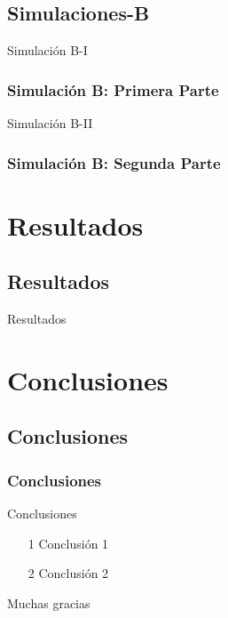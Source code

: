 \documentclass{beamer}
\begin{document}
\subsection{Simulaciones-B}
\begin{frame}{Simulación B-I}

\frametitle{Simulación B: Primera Parte}
\end{frame}

\begin{frame}{Simulación B-II}

\frametitle{Simulación B: Segunda Parte}
\end{frame}


\section{Resultados}

\subsection{Resultados}
\begin{frame}{Resultados}

\end{frame}

\section{Conclusiones}
\subsection{Conclusiones}
\frametitle{Conclusiones}
\begin{frame}{Conclusiones}
\begin{itemize}
    \item[1] Conclusión 1
    \item[2] Conclusión 2
\end{itemize}
\end{frame}

\begin{frame}
\Huge{\centerline{Muchas gracias}}
\end{frame}

\end{document}
